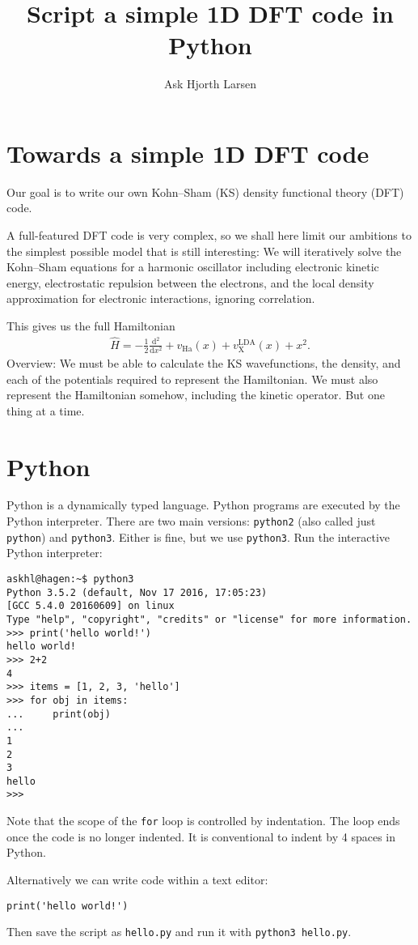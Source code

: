 \documentclass{article}
\title{Script a simple 1D DFT code in Python}
\author{Ask Hjorth Larsen}
\newcommand{\dee}[0]{\mathrm d}
\newcommand{\diff}[2]{\frac{\dee #1}{\dee #2}}
\newcommand{\Ha}[0]{\mathrm{Ha}}
\begin{document}
\section{Towards a simple 1D DFT code}

Our goal is to write our own Kohn--Sham (KS) density functional theory
(DFT) code.

A full-featured DFT code is very complex, so we shall here limit our ambitions
to the simplest possible model that is still interesting:
We will iteratively solve the Kohn--Sham
equations for a harmonic oscillator including electronic kinetic
energy, electrostatic repulsion between the electrons, and the
local density approximation for electronic interactions, ignoring correlation.

This gives us the full Hamiltonian
\begin{align}
\hat H = -\frac12 \diff{^2}{x^2} + v_\Ha(x) + v_{\mathrm X}^{\mathrm{LDA}}(x) + x^2.
\end{align}
Overview: We must be able to calculate the KS wavefunctions, the
density, and each of the potentials required to represent the
Hamiltonian.  We must also represent the Hamiltonian somehow,
including the kinetic operator.  But one thing at a time.

\section{Python}
Python is a dynamically typed language.  Python programs are executed
by the Python interpreter.
There are two main versions:
\texttt{python2} (also called just \texttt{python}) and \texttt{python3}.
Either is fine, but we use \texttt{python3}.
Run the interactive Python interpreter:

\begin{verbatim}
askhl@hagen:~$ python3
Python 3.5.2 (default, Nov 17 2016, 17:05:23)
[GCC 5.4.0 20160609] on linux
Type "help", "copyright", "credits" or "license" for more information.
>>> print('hello world!')
hello world!
>>> 2+2
4
>>> items = [1, 2, 3, 'hello']
>>> for obj in items:
...     print(obj)
...
1
2
3
hello
>>>
\end{verbatim}
Note that the scope of the \texttt{for} loop is controlled by indentation.
The loop ends once the code is no longer indented.
It is conventional to indent by 4 spaces in Python.

Alternatively we can write code within a text editor:
\begin{lstlisting}
print('hello world!')
\end{lstlisting}
Then save the script as \texttt{hello.py} and run it with
\texttt{python3 hello.py}.
\end{document}

